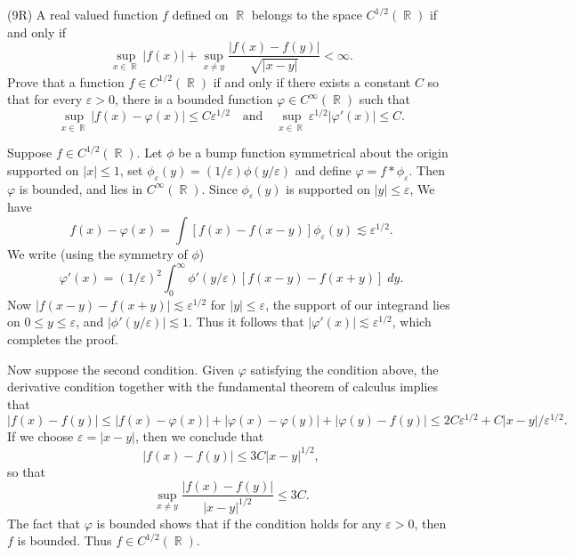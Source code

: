 \documentclass[answers]{exam}
\DeclareMathOperator{\RR}{\mathbb{R}}
\theoremstyle{problemstyle}
\newcommand{\1}[1]{\textbf{1}_{\left[#1\right]}} %
\begin{document}
\begin{questions}
\begin{parts}
\begin{solution}
\begin{comment}
    
    One can argue (Morrey's inequality for example, plus the density of $C_c^\infty(\RR)$ in $H^1(\RR)$), that if $g \in K$, then $g(0) = 0$.
\end{comment}
\end{solution}

\end{parts}


\question (9R) A real valued function $f$ defined on $\RR$ belongs to the space $C^{1/2}(\RR)$ if and only if
%
\[ \sup_{x \in \RR} |f(x)| + \sup_{x \neq y} \frac{|f(x) - f(y)|}{\sqrt{|x - y|}} < \infty. \]
%
Prove that a function $f \in C^{1/2}(\RR)$ if and only if there exists a constant $C$ so that for every $\varepsilon > 0$, there is a bounded function $\varphi \in C^\infty(\RR)$ such that
%
\[ \sup_{x \in \RR} |f(x) - \varphi(x)| \leq C \varepsilon^{1/2} \quad\text{and}\quad \sup_{x \in \RR} \varepsilon^{1/2} |\varphi'(x)| \leq C. \]
\begin{solution}
    Suppose $f \in C^{1/2}(\RR)$. Let $\phi$ be a bump function symmetrical about the origin supported on $|x| \leq 1$, set $\phi_\varepsilon(y) = (1/\varepsilon) \phi(y/\varepsilon)$ and define $\varphi = f * \phi_\varepsilon$. Then $\varphi$ is bounded, and lies in $C^\infty(\RR)$. Since $\phi_\varepsilon(y)$ is supported on $|y| \leq \varepsilon$, We have
    \[ f(x) - \varphi(x) = \int [f(x) - f(x-y)] \phi_\varepsilon(y) \lesssim \varepsilon^{1/2}. \]
    We write (using the symmetry of $\phi$)
    \[ \varphi'(x) = (1/\varepsilon)^2 \int_0^\infty \phi'(y/\varepsilon) [f(x-y) - f(x+y)]\; dy. \]
    Now $|f(x-y) - f(x+y)| \lesssim \varepsilon^{1/2}$ for $|y| \leq \varepsilon$, the support of our integrand lies on $0 \leq y \leq \varepsilon$, and $|\phi'(y/\varepsilon)| \lesssim 1$. Thus it follows that $|\varphi'(x)| \lesssim \varepsilon^{1/2}$, which completes the proof.

    Now suppose the second condition. Given $\varphi$ satisfying the condition above, the derivative condition together with the fundamental theorem of calculus implies that
    \[ |f(x) - f(y)| \leq |f(x) - \varphi(x)| + |\varphi(x) - \varphi(y)| + |\varphi(y) - f(y)| \leq 2C \varepsilon^{1/2} + C |x - y| / \varepsilon^{1/2}. \]
    If we choose $\varepsilon = |x - y|$, then we conclude that
    \[ |f(x) - f(y)| \leq 3C |x-y|^{1/2}, \]
    so that
    \[ \sup_{x \neq y} \frac{|f(x) - f(y)|}{|x-y|^{1/2}} \leq 3C. \]
    The fact that $\varphi$ is bounded shows that if the condition holds for any $\varepsilon > 0$, then $f$ is bounded. Thus $f \in C^{1/2}(\RR)$.
\end{solution}










\end{questions}
\end{document}
